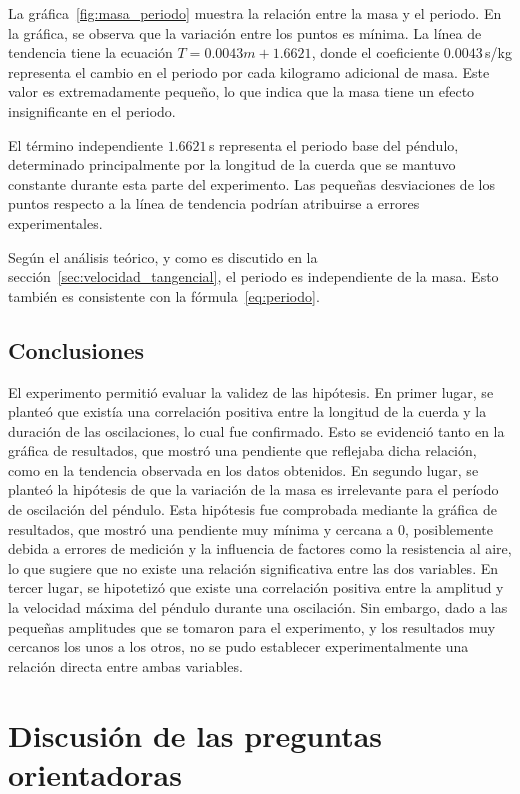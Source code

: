 \documentclass[letterpaper]{report}
\numberwithin{table}{section}
\begin{document}
La gráfica~\ref{fig:masa_periodo} muestra la relación entre la masa y
el periodo. En la gráfica, se observa que la variación entre los
puntos es mínima. La línea de tendencia tiene la ecuación $T =
0.0043m + 1.6621$,
donde el coeficiente $0.0043$\,s/kg representa el cambio en el periodo por cada
kilogramo adicional de masa. Este valor es extremadamente pequeño, lo que indica
que la masa tiene un efecto insignificante en el periodo.

El término independiente $1.6621$\,s representa el periodo base del péndulo,
determinado principalmente por la longitud de la cuerda que se mantuvo constante
durante esta parte del experimento. Las pequeñas desviaciones de los puntos
respecto a la línea de tendencia podrían atribuirse a errores experimentales.

Según el análisis teórico, y como es discutido en
la sección~\ref{sec:velocidad_tangencial}, el periodo es independiente de la
masa. Esto también es consistente con la fórmula~\eqref{eq:periodo}.

\section{Conclusiones}

El experimento permitió evaluar la validez de las hipótesis.
En primer lugar, se planteó que existía una correlación positiva
entre la longitud de la cuerda y la duración de las oscilaciones, lo
cual fue confirmado. Esto se evidenció tanto en la gráfica de
resultados, que mostró una pendiente que reflejaba dicha relación,
como en la tendencia observada en los datos obtenidos. En segundo
lugar, se planteó la hipótesis de que la variación de la masa es
irrelevante para el período de oscilación del péndulo. Esta hipótesis
fue comprobada mediante la gráfica de resultados, que mostró una
pendiente muy mínima y cercana a 0, posiblemente debida a errores
de medición y la influencia de factores como la resistencia al aire,
lo que sugiere que no existe una relación significativa entre las dos
variables. En tercer lugar, se hipotetizó que existe una correlación
positiva entre la amplitud y la velocidad máxima del péndulo durante
una oscilación. Sin embargo, dado a las pequeñas amplitudes que se
tomaron para el experimento, y los resultados muy cercanos los unos a
los otros, no se pudo establecer experimentalmente una relación
directa entre ambas variables.

\chapter{Discusión de las preguntas orientadoras}
\end{document}
